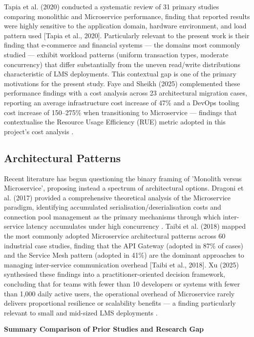 Tapia et al. (2020) conducted a systematic review of 31 primary studies comparing monolithic 
and Microservice performance, finding that reported results were highly sensitive to the 
application domain, hardware environment, and load pattern used [Tapia et al., 2020]. Particularly 
relevant to the present work is their finding that e-commerce and financial systems — the domains 
most commonly studied — exhibit workload patterns (uniform transaction types, moderate concurrency) 
that differ substantially from the uneven read/write distributions characteristic of LMS deployments.
This contextual gap is one of the primary motivations for the present study. Faye and Sheikh (2025) 
complemented these performance findings with a cost analysis across 23 architectural migration cases, 
reporting an average infrastructure cost increase of 47\% and a DevOps tooling cost increase of 150–275\% 
when transitioning to Microservice — findings that contextualise the Resource Usage Efficiency (RUE) 
metric adopted in this project's cost analysis \cite{Yogant_Faye}.

\subsection{Architectural Patterns}
Recent literature has begun questioning the binary framing of 'Monolith versus Microservice', proposing 
instead a spectrum of architectural options. Dragoni et al. (2017) provided a comprehensive theoretical 
analysis of the Microservice paradigm, identifying accumulated serialisation/deserialisation costs and 
connection pool management as the primary mechanisms through which inter-service latency accumulates 
under high concurrency \cite{Nicola_Dragoni}. Taibi et al. (2018) mapped the most commonly adopted 
Microservice architectural patterns across 60 industrial case studies, finding that the API Gateway 
(adopted in 87\% of cases) and the Service Mesh pattern (adopted in 41\%) are the dominant approaches 
to managing inter-service communication overhead [Taibi et al., 2018]. Xu (2025) synthesised these 
findings into a practitioner-oriented decision framework, concluding that for teams with fewer than 
10 developers or systems with fewer than 1,000 daily active users, the operational overhead of 
Microservice rarely delivers proportional resilience or scalability benefits — a finding particularly 
relevant to small and mid-sized LMS deployments \cite{Alex_xu_2025}.

\textbf{Summary Comparison of Prior Studies and Research Gap} 

